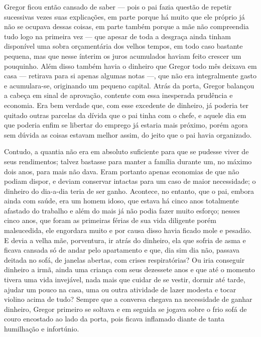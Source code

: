Gregor ficou então cansado de saber --- pois o pai fazia questão de repetir
sucessivas vezes suas explicações, em parte porque há muito que ele
próprio já não se ocupava dessas coisas, em parte também porque a mãe não
compreendia tudo logo na primeira vez --- que apesar de toda a desgraça
ainda tinham disponível uma sobra orçamentária dos velhos tempos, em todo
caso bastante pequena, mas que nesse ínterim os juros acumulados haviam
feito crescer um pouquinho. Além disso também havia o dinheiro que Gregor
todo mês deixava em casa --- retirava para si apenas algumas notas ---, que
não era integralmente gasto e acumulara-se, originando um pequeno capital.
Atrás da porta, Gregor balançou a cabeça em sinal de aprovação, contente
com essa inesperada prudência e economia. Era bem verdade que, com esse
excedente de dinheiro, já poderia ter quitado outras parcelas da dívida
que o pai tinha com o chefe, e aquele dia em que poderia enfim se libertar
do emprego já estaria mais próximo, porém agora sem dúvida as coisas
estavam melhor assim, do jeito que o pai havia organizado.

Contudo, a quantia não era em absoluto suficiente para que se pudesse
viver de seus rendimentos; talvez bastasse para manter a família durante
um, no máximo dois anos, para mais não dava. Eram portanto apenas
economias de que não podiam dispor, e deviam conservar intactas para um
caso de maior necessidade; o dinheiro do dia-a-dia teria de ser ganho.
Acontece, no entanto, que o pai, embora ainda com saúde, era um homem
idoso, que estava há cinco anos totalmente afastado do trabalho e além do
mais já não podia fazer muito esforço; nesses cinco anos, que foram as
primeiras férias de sua vida diligente porém malsucedida, ele engordara
muito e por causa disso havia ficado mole e pesadão. E devia a velha mãe,
porventura, ir atrás do dinheiro, ela que sofria de asma e ficava cansada
só de andar pelo apartamento e que, dia sim dia não, passava deitada no
sofá, de janelas abertas, com crises respiratórias? Ou iria conseguir
dinheiro a irmã, ainda uma criança com seus dezessete anos e que até o
momento tivera uma vida invejável, nada mais que cuidar de se vestir,
dormir até tarde, ajudar um pouco na casa, uma ou outra atividade de lazer
modesta e tocar violino acima de tudo? Sempre que a conversa chegava na
necessidade de ganhar dinheiro, Gregor primeiro se soltava e em seguida se
jogava sobre o frio sofá de couro encostado ao lado da porta, pois ficava
inflamado diante de tanta humilhação e infortúnio.

